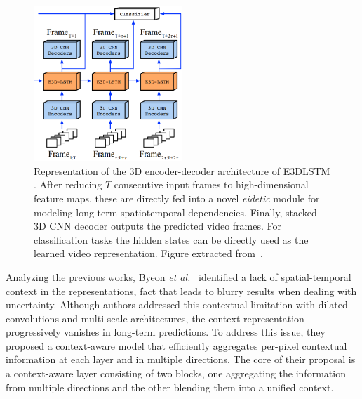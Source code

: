 \begin{figure}[!tbp]
	\centering
	\includegraphics[width=0.5\textwidth]{Figures/videoprediction/methods/e3d_lstm.png}
	\caption{Representation of the 3D encoder-decoder architecture of \ac{E3DLSTM} \cite{Wang2019b}. After reducing $T$ consecutive input frames to high-dimensional feature maps, these are directly fed into a novel \textit{eidetic} module for modeling long-term spatiotemporal dependencies. Finally, stacked 3D \ac{CNN} decoder outputs the predicted video frames. For classification tasks the hidden states can be directly used as the learned video representation. Figure extracted from~\cite{Wang2019b}.}
	\label{fig:e3d_lstm}
\end{figure}

Analyzing the previous works, Byeon \textit{et al.}~\cite{Byeon2018} identified a lack of spatial-temporal context in the representations, fact that leads to blurry results when dealing with uncertainty. Although authors addressed this contextual limitation with dilated convolutions and multi-scale architectures, the context representation progressively vanishes in long-term predictions. To address this issue, they proposed a context-aware model that efficiently aggregates per-pixel contextual information at each layer and in multiple directions. The core of their proposal is a context-aware layer consisting of two blocks, one aggregating the information from multiple directions and the other blending them into a unified context.

